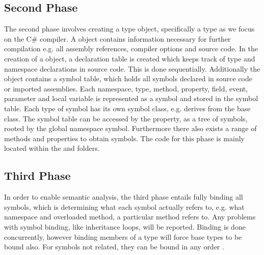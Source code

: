 \subsection{Second Phase}
\label{subsec:roslyn_second_phase}
The second phase involves creating a  type object, specifically a  type as we focus on the C\# compiler. A  object contains information necessary for further compilation e.g. all assembly references, compiler options and source code. In the creation of a  object, a declaration table is created which keeps track of type and namespace declarations in source code\cite{sadovRoslynPerf}. This is done sequentially\cite{sadovRoslynPerf}. Additionally the  object contains a symbol table, which holds all symbols declared in source code or imported assemblies. Each namespace, type, method, property, field, event, parameter and local variable is represented as a symbol and stored in the symbol table\cite[p. 14]{ng2012roslyn}. Each type of symbol has its own symbol class, e.g.  derives from the base  class. The symbol table can be accessed by the  property, as a tree of symbols, rooted by the global namespace symbol. Furthermore there also exists a range of methods and properties to obtain symbols. The code for this phase is mainly located within the  and  folders.

\subsection{Third Phase}
In order to enable semantic analysis, the third phase entails fully binding all symbols, which is determining what each symbol actually refers to, e.g. what namespace and overloaded method, a particular method refers to. Any problems with symbol binding, like inheritance loops, will be reported. Binding is done concurrently, however binding members of a type will force base types to be bound also. For symbols not related, they can be bound in any order \cite{sadovRoslynPerf}.

